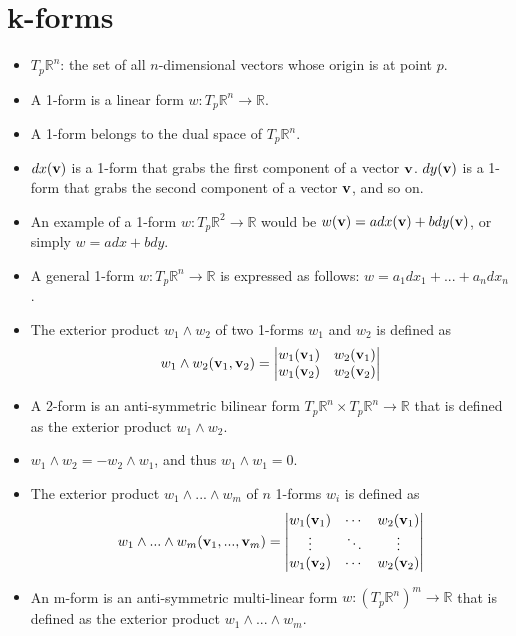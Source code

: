 \documentclass[11pt]{article}
\begin{document}
\section{k-forms}
\begin{itemize}

    \item $T_p \mathbb{R}^n$: the set of all $n$-dimensional vectors whose origin is at point $p$.

    \item A 1-form is a linear form $w:T_p \mathbb{R}^n \to \mathbb{R}$.

    \item A 1-form belongs to the dual space of $T_p \mathbb{R}^n$.

    \item $dx(\mathbf{v})$ is a 1-form that grabs the first component of a vector $\mathbf{v}$. $dy(\mathbf{v})$ is a 1-form that grabs the second component of a vector $\mathbf{v}$, and so on.

    \item An example of a 1-form $w:T_p \mathbb{R}^2 \to \mathbb{R}$ would be $w(\mathbf{v}) = a dx(\mathbf{v}) + b dy(\mathbf{v})$, or simply $w = a dx + b dy$.

    \item A general 1-form $w:T_p \mathbb{R}^n \to \mathbb{R}$ is expressed as follows: $w = a_1 dx_1 + ... + a_n dx_n$.

    \item The exterior product $w_1 \wedge w_2$ of two 1-forms $w_1$ and $w_2$ is defined as
    \begin{equation}
        w_1 \wedge w_2(\mathbf{v}_1, \mathbf{v}_2) =  
        \begin{vmatrix}
            w_1(\mathbf{v}_1) & w_2(\mathbf{v}_1) \\
            w_1(\mathbf{v}_2) & w_2(\mathbf{v}_2)
        \end{vmatrix}
    \end{equation}

    \item A 2-form is an anti-symmetric bilinear form $T_p \mathbb{R}^n \times T_p \mathbb{R}^n \to \mathbb{R}$ that is defined as the exterior product $w_1 \wedge w_2$.

    \item $w_1 \wedge w_2 = -w_2 \wedge w_1$, and thus $w_1 \wedge w_1 = 0$.
    
    \item The exterior product $w_1 \wedge ...\wedge w_m$ of $n$ 1-forms $w_i$ is defined as
    \begin{equation}
        w_1 \wedge ... \wedge w_m(\mathbf{v}_1, ..., \mathbf{v}_m) = 
        \begin{vmatrix}
            w_1(\mathbf{v}_1) & \cdots & w_2(\mathbf{v}_1) \\
            \vdots & \ddots & \vdots \\
            w_1(\mathbf{v}_2) & \cdots & w_2(\mathbf{v}_2)
        \end{vmatrix}
    \end{equation}

    \item An m-form is an anti-symmetric multi-linear form $w:(T_p \mathbb{R}^n)^m \to \mathbb{R}$ that is defined as the exterior product $w_1 \wedge ...\wedge w_m$.

\end{itemize}
\end{document}
